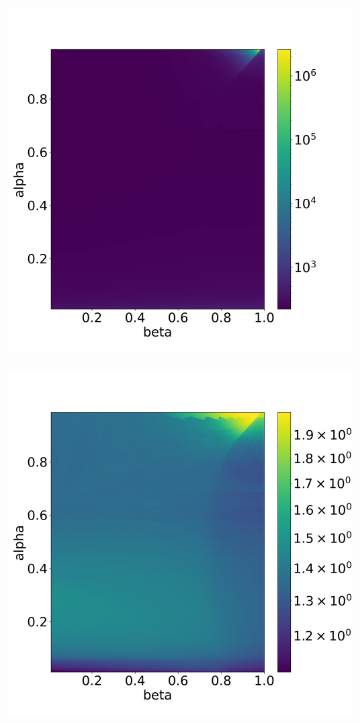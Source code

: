 \documentclass{report}
\begin{document}
\begin{figure}[H]
    \centering
    \begin{subfigure}{0.32\textwidth}
    	\centering
    	\includegraphics[width=1\textwidth]{images/analysis_BDF12_TS.png}
        \label{fig:numberTimeStepsBDF12}
    \end{subfigure}
    \begin{subfigure}{0.32\textwidth}
    	\centering
    	\includegraphics[width=1\textwidth]{images/analysis_BDF12_NI.png}

\end{subfigure}
\end{figure}
\end{document}
